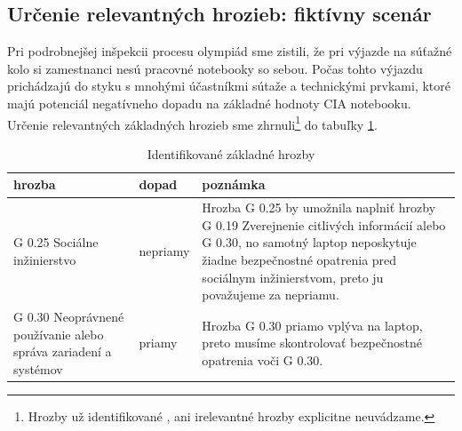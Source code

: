 \subsection*{Určenie relevantných hrozieb: fiktívny scenár}

Pri podrobnejšej inšpekcii procesu olympiád sme zistili, že pri výjazde na súťažné kolo si zamestnanci nesú pracovné notebooky so sebou.
Počas tohto výjazdu prichádzajú do styku s mnohými účastníkmi sútaže a technickými prvkami, ktoré majú potenciál negatívneho dopadu na
základné hodnoty CIA notebooku. Určenie relevantných základných hrozieb sme zhrnuli\footnote{Hrozby už identifikované \cite{GSK}, ani
irelevantné hrozby explicitne neuvádzame.} do tabuľky \ref{tab:elemthreatid}.
\begin{table}[h!]
    \caption{Identifikované základné hrozby}
    \label{tab:elemthreatid}
    \begin{center}
        \footnotesize
        \begin{tabular}{ |p{}|p{}|p{}| }
        \hline
        hrozba & dopad & poznámka \\
        \hline
        \hline
        G 0.25 Sociálne inžinierstvo & nepriamy & Hrozba G 0.25 by umožnila naplniť hrozby G 0.19 Zverejnenie citlivých informácií alebo G 0.30,
        no samotný laptop neposkytuje žiadne bezpečnostné opatrenia pred sociálnym inžinierstvom, preto ju považujeme za nepriamu.  \\
        \hline
        G 0.30 Neoprávnené používanie alebo správa zariadení a systémov & priamy &  Hrozba G 0.30 priamo vplýva na laptop, preto musíme
        skontrolovať bezpečnostné opatrenia voči G 0.30.\\
        \hline
        \end{tabular}
    \end{center}
\end{table}

